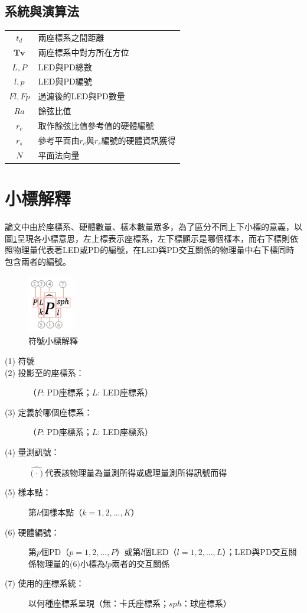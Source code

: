 \onehalfspacing

\subsection*{系統與演算法}

\begin{longtable}[l]{cl}
    $t_d$ & 兩座標系之間距離\\
    $\boldsymbol{Tv}$ & 兩座標系中對方所在方位\\
    $L,P$ & LED與PD總數\\
    $l,p$ & LED與PD編號\\
    $Fl,Fp$ & 過濾後的LED與PD數量\\
    $Ra$& 餘弦比值\\
    $r_c$& 取作餘弦比值參考值的硬體編號\\
    $r_s$& 參考平面由$r_c$與$r_s$編號的硬體資訊獲得\\
    $N$& 平面法向量\\

\end{longtable}




\onehalfspacing

\section*{小標解釋}

論文中由於座標系、硬體數量、樣本數量眾多，為了區分不同上下小標的意義，以圖\ref{pic:symbol}呈現各小標意思，左上標表示座標系，左下標顯示是哪個樣本，而右下標則依照物理量代表著LED或PD的編號，在LED與PD交互關係的物理量中右下標同時包含兩者的編號。

\begin{figure}[ht]
	\centering
	\includegraphics[width=2cm]{ch1pic/not_whole.png}
    \caption{符號小標解釋}
    \label{pic:symbol}
\end{figure}



\begin{description}
    \item[(1) 符號] 
    \item[(2) 投影至的座標系：] （$P$: PD座標系；$L$: LED座標系）
    \item[(3) 定義於哪個座標系：] （$P$: PD座標系；$L$: LED座標系）
    \item[(4) 量測訊號：] $\hat{(\cdot)}$代表該物理量為量測所得或處理量測所得訊號而得
    \item[(5) 樣本點：] 第$k$個樣本點（$k=1,2,...,K$）
    \item[(6) 硬體編號：] 第$p$個PD（$p=1,2,...,P$）或第$l$個LED（$l=1,2,...,L$）；LED與PD交互關係物理量的(6)小標為$lp$兩者的交互關係
    \item[(7) 使用的座標系統：]  以何種座標系呈現（無：卡氏座標系；$sph$：球座標系）
\end{description}


